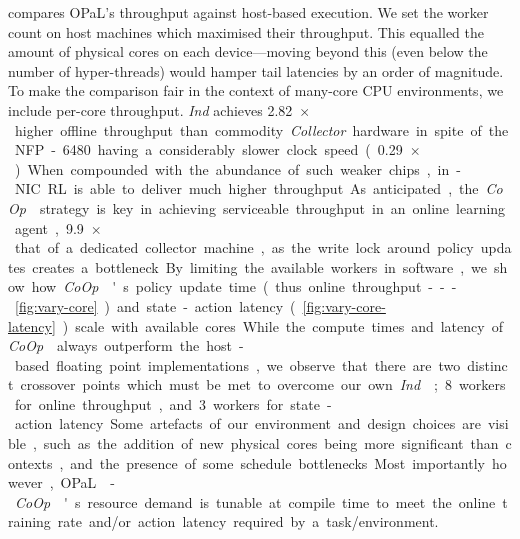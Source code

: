\documentclass[
sigconf,natbib=false
]{acmart}
\newcommand{\approachshort}{OPaL}
\newcommand{\Coopfw}{\emph{CoOp}}
\newcommand{\Indfw}{\emph{Ind}}
\begin{document}
 compares \approachshort{}'s throughput against host-based execution.
We set the worker count on host machines which maximised their throughput.
This equalled the amount of physical cores on each device---moving beyond this (even below the number of hyper-threads) would hamper tail latencies by an order of magnitude.
To make the comparison fair in the context of many-core CPU environments, we include per-core throughput.
\Indfw{} achieves \SI{2.82}{$\times$} higher offline throughput than commodity \emph{Collector} hardware in spite of the NFP-6480 having a considerably slower clock speed (\SI{0.29}{$\times$}).
When compounded with the abundance of such weaker chips, in-NIC RL is able to deliver much higher throughput.
As anticipated, the \Coopfw{} strategy is key in achieving serviceable throughput in an online learning agent, \SI{9.9}{$\times$} that of a dedicated collector machine, as the write lock around policy updates creates a bottleneck.

By limiting the available workers in software, we show how \Coopfw{}'s policy update time (thus  online throughput---\cref{fig:vary-core}) and state-action latency (\cref{fig:vary-core-latency}) scale with available cores.
While the compute times and latency of \Coopfw{} always outperform the host-based floating point implementations, we observe that there are two distinct crossover points which must be met to overcome our own \Indfw{}; \num{8} workers for online throughput, and \num{3} workers for state-action latency.
Some artefacts of our environment and design choices are visible, such as the addition of new physical cores being more significant than contexts, and the presence of some schedule bottlenecks.
Most importantly however, \approachshort{}-\Coopfw{}'s resource demand is tunable at compile time to meet the online training rate and/or action latency required by a task/environment.
\end{document}
